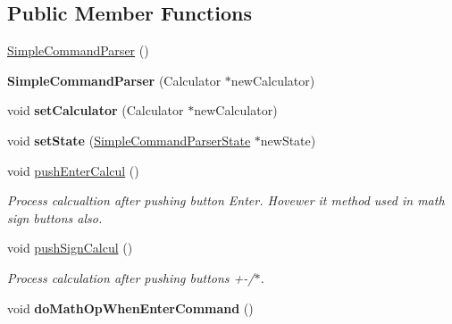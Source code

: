 \subsection*{Public Member Functions}
\begin{DoxyCompactItemize}
\item 
\hyperlink{class_simple_command_parser_a36f481c3b38076dd51af0b3b21dfc799}{Simple\+Command\+Parser} ()
\item 
\hypertarget{class_simple_command_parser_a62668b9abee69fbbe2abf7e46858691a}{}{\bfseries Simple\+Command\+Parser} (Calculator $\ast$new\+Calculator)\label{class_simple_command_parser_a62668b9abee69fbbe2abf7e46858691a}

\item 
\hypertarget{class_simple_command_parser_a759779af9ad397dcd267b2ac43a43509}{}void {\bfseries set\+Calculator} (Calculator $\ast$new\+Calculator)\label{class_simple_command_parser_a759779af9ad397dcd267b2ac43a43509}

\item 
\hypertarget{class_simple_command_parser_ad852317f775853e0e39f82c26753a0e1}{}void {\bfseries set\+State} (\hyperlink{class_simple_command_parser_state}{Simple\+Command\+Parser\+State} $\ast$new\+State)\label{class_simple_command_parser_ad852317f775853e0e39f82c26753a0e1}

\item 
\hypertarget{class_simple_command_parser_a029433f8b08defadd23ea777b1d7018a}{}void \hyperlink{class_simple_command_parser_a029433f8b08defadd23ea777b1d7018a}{push\+Enter\+Calcul} ()\label{class_simple_command_parser_a029433f8b08defadd23ea777b1d7018a}

\begin{DoxyCompactList}\small\item\em Process calcualtion after pushing button Enter. Hovewer it method used in math sign buttons also. \end{DoxyCompactList}\item 
\hypertarget{class_simple_command_parser_a3cd15cf8330f7da84256e0d5af5055bc}{}void \hyperlink{class_simple_command_parser_a3cd15cf8330f7da84256e0d5af5055bc}{push\+Sign\+Calcul} ()\label{class_simple_command_parser_a3cd15cf8330f7da84256e0d5af5055bc}

\begin{DoxyCompactList}\small\item\em Process calculation after pushing buttons +-\//$\ast$. \end{DoxyCompactList}\item 
\hypertarget{class_simple_command_parser_a2bda6ce2c0a67a245abd22ff77c72b47}{}void {\bfseries do\+Math\+Op\+When\+Enter\+Command} ()\label{class_simple_command_parser_a2bda6ce2c0a67a245abd22ff77c72b47}


\end{DoxyCompactItemize}
